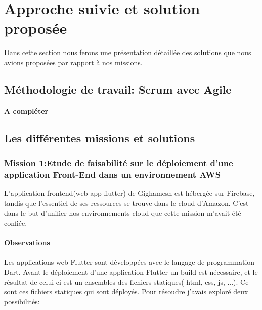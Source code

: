 
\chapter{Approche suivie et solution proposée} %

\label{Chaptre4} %

Dans cette section nous ferons une présentation détaillée des solutions que nous avions proposées par rapport à nos missions.



\section{Méthodologie de travail: Scrum avec Agile}
\textbf{A compléter}
\section{Les différentes missions et solutions}
\subsection{Mission 1:Etude de faisabilité sur le déploiement d’une application Front-End dans un environnement AWS}
L’application frontend(web app flutter) de Gighamesh est hébergée sur Firebase, tandis que l’essentiel de
ses ressources se trouve dans le cloud d’Amazon. C’est dans le but d’unifier nos environnements cloud que
cette mission m’avait été confiée.
\subsubsection{Observations}
Les applications web Flutter sont  développées avec le langage de programmation Dart. Avant le déploiement d'une application Flutter un build est nécessaire, 
et le résultat de celui-ci est un ensembles des fichiers statiques( html, css, js, ...). Ce sont ces fichiers statiques qui sont déployés.
Pour résoudre  j’avais exploré deux possibilités:
